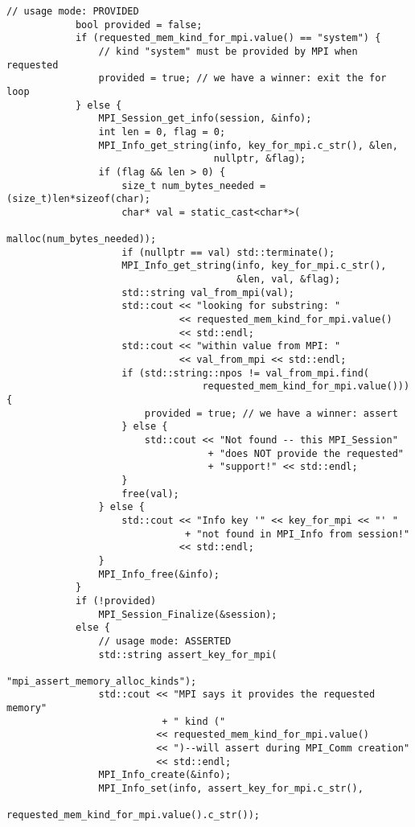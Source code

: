 \begin{example}
\begin{lstlisting}[language={[MPI]C++}]
            // usage mode: PROVIDED
            bool provided = false;
            if (requested_mem_kind_for_mpi.value() == "system") {
                // kind "system" must be provided by MPI when requested
                provided = true; // we have a winner: exit the for loop
            } else {
                MPI_Session_get_info(session, &info);
                int len = 0, flag = 0;
                MPI_Info_get_string(info, key_for_mpi.c_str(), &len,
                                    nullptr, &flag);
                if (flag && len > 0) {
                    size_t num_bytes_needed = (size_t)len*sizeof(char);
                    char* val = static_cast<char*>(
                                              malloc(num_bytes_needed));
                    if (nullptr == val) std::terminate();
                    MPI_Info_get_string(info, key_for_mpi.c_str(),
                                        &len, val, &flag);
                    std::string val_from_mpi(val);
                    std::cout << "looking for substring: "
                              << requested_mem_kind_for_mpi.value()
                              << std::endl;
                    std::cout << "within value from MPI: "
                              << val_from_mpi << std::endl;
                    if (std::string::npos != val_from_mpi.find(
                                  requested_mem_kind_for_mpi.value())) {
                        provided = true; // we have a winner: assert
                    } else {
                        std::cout << "Not found -- this MPI_Session"
                                   + "does NOT provide the requested"
                                   + "support!" << std::endl;
                    }
                    free(val);
                } else {
                    std::cout << "Info key '" << key_for_mpi << "' "
                               + "not found in MPI_Info from session!"
                              << std::endl;
                }
                MPI_Info_free(&info);
            }
            if (!provided)
                MPI_Session_Finalize(&session);
            else {
                // usage mode: ASSERTED
                std::string assert_key_for_mpi(
                                       "mpi_assert_memory_alloc_kinds");
                std::cout << "MPI says it provides the requested memory"
                           + " kind ("
                          << requested_mem_kind_for_mpi.value()
                          << ")--will assert during MPI_Comm creation"
                          << std::endl;
                MPI_Info_create(&info);
                MPI_Info_set(info, assert_key_for_mpi.c_str(),
                            requested_mem_kind_for_mpi.value().c_str());


\end{lstlisting}
\end{example}
